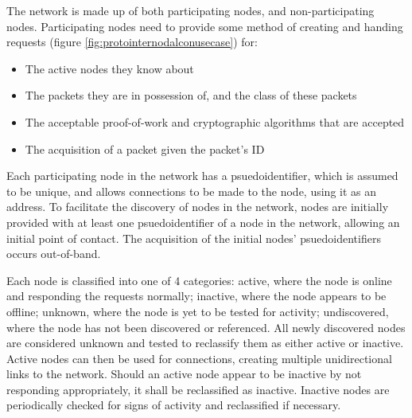 The network is made up of both participating nodes, and non-participating nodes. Participating nodes need to provide some method of creating and handing requests (figure \ref{fig:protointernodalconusecase}) for: 
\begin{itemize}[topsep=-5pt,itemsep=-1ex,partopsep=2ex,parsep=1.5ex]
	\item The active nodes they know about
	\item The packets they are in possession of, and the class of these packets
	\item The acceptable proof-of-work and cryptographic algorithms that are accepted
	\item The acquisition of a packet given the packet's ID
\end{itemize} \vspace{0.7ex}

Each participating node in the network has a psuedoidentifier, which is assumed to be unique, and allows connections to be made to the node, using it as an address. To facilitate the discovery of nodes in the network, nodes are initially provided with at least one psuedoidentifier of a node in the network, allowing an initial point of contact. The acquisition of the initial nodes' psuedoidentifiers occurs out-of-band.

Each node is classified into one of 4 categories: active, where the node is online and responding the requests normally; inactive, where the node appears to be offline; unknown, where the node is yet to be tested for activity; undiscovered, where the node has not been discovered or referenced. All newly discovered nodes are considered unknown and tested to reclassify them as either active or inactive. Active nodes can then be used for connections, creating multiple unidirectional links to the network. Should an active node appear to be inactive by not responding appropriately, it shall be reclassified as inactive. Inactive nodes are periodically checked for signs of activity and reclassified if necessary. 


